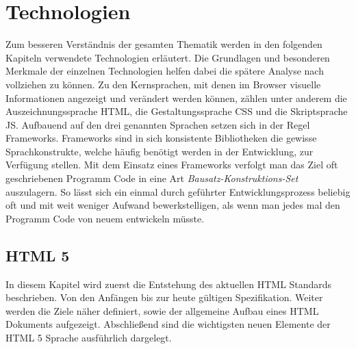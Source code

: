 \section{Technologien}\label{technologien}
Zum besseren Verständnis der gesamten Thematik werden in den folgenden Kapiteln verwendete Technologien erläutert. Die Grundlagen und besonderen Merkmale der einzelnen Technologien helfen dabei die spätere Analyse nach vollziehen zu können. Zu den Kernsprachen, mit denen im Browser visuelle Informationen angezeigt und verändert werden können, zählen unter anderem die Auszeichnungssprache HTML, die Gestaltungssprache CSS und die Skriptsprache JS. Aufbauend auf den drei genannten Sprachen setzen sich in der Regel Frameworks. Frameworks sind in sich konsistente Bibliotheken die gewisse Sprachkonstrukte, welche häufig benötigt werden in der Entwicklung, zur Verfügung stellen. Mit dem Einsatz eines Frameworks verfolgt man das Ziel oft geschriebenen Programm Code in eine Art \textit{Bausatz-Konstruktions-Set} auszulagern. So lässt sich ein einmal durch geführter Entwicklungsprozess beliebig oft und mit weit weniger Aufwand bewerkstelligen, als wenn man jedes mal den Programm Code von neuem entwickeln müsste.

\subsection{HTML 5}
In diesem Kapitel wird zuerst die Entstehung des aktuellen HTML Standards beschrieben. Von den Anfängen bis zur heute gültigen Spezifikation. Weiter werden die Ziele näher definiert, sowie der allgemeine Aufbau eines HTML Dokuments aufgezeigt. Abschließend sind die wichtigsten neuen Elemente der HTML 5 Sprache ausführlich dargelegt.

